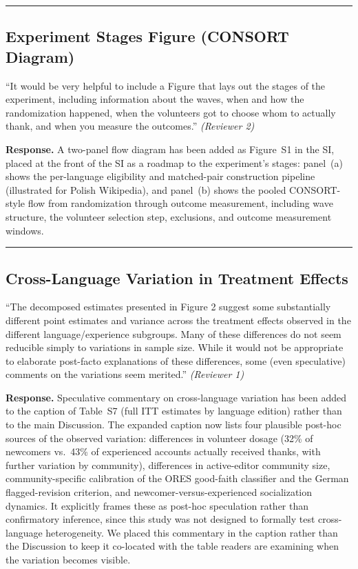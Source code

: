 \documentclass[12pt]{article}
\newenvironment{reviewquote}{%
  \def\FrameCommand{{\color{quotebarcolor}\vrule width 2pt}\colorbox{quotebg}}%
  \MakeFramed{\advance\hsize-\width \FrameRestore}%
  \small
}{%
  \endMakeFramed
}
\begin{document}
\bigskip\hrule\bigskip

\subsection{Experiment Stages Figure (CONSORT Diagram)}

\begin{reviewquote}
``It would be very helpful to include a Figure that lays out the stages of the experiment, including information about the waves, when and how the randomization happened, when the volunteers got to choose whom to actually thank, and when you measure the outcomes.'' \textit{(Reviewer 2)}
\end{reviewquote}

\textbf{Response.} A two-panel flow diagram has been added as Figure~S1 in the SI, placed at the front of the SI as a roadmap to the experiment's stages: panel~(a) shows the per-language eligibility and matched-pair construction pipeline (illustrated for Polish Wikipedia), and panel~(b) shows the pooled CONSORT-style flow from randomization through outcome measurement, including wave structure, the volunteer selection step, exclusions, and outcome measurement windows.

\bigskip\hrule\bigskip

\subsection{Cross-Language Variation in Treatment Effects}

\begin{reviewquote}
``The decomposed estimates presented in Figure 2 suggest some substantially different point estimates and variance across the treatment effects observed in the different language/experience subgroups. Many of these differences do not seem reducible simply to variations in sample size. While it would not be appropriate to elaborate post-facto explanations of these differences, some (even speculative) comments on the variations seem merited.'' \textit{(Reviewer 1)}
\end{reviewquote}

\textbf{Response.} Speculative commentary on cross-language variation has been added to the caption of Table~S7 (full ITT estimates by language edition) rather than to the main Discussion. The expanded caption now lists four plausible post-hoc sources of the observed variation: differences in volunteer dosage (32\% of newcomers vs.\ 43\% of experienced accounts actually received thanks, with further variation by community), differences in active-editor community size, community-specific calibration of the ORES good-faith classifier and the German flagged-revision criterion, and newcomer-versus-experienced socialization dynamics. It explicitly frames these as post-hoc speculation rather than confirmatory inference, since this study was not designed to formally test cross-language heterogeneity. We placed this commentary in the caption rather than the Discussion to keep it co-located with the table readers are examining when the variation becomes visible.
\end{document}
